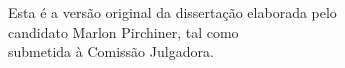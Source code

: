 \documentclass[12pt,twoside,a4paper]{book}
\numberwithin{equation}{section}
\begin{document}
    \vskip 2cm

    \begin{flushright}
	Esta é a versão original da dissertação elaborada pelo\\
	candidato Marlon Pirchiner, tal como \\
	submetida à Comissão Julgadora.
    \end{flushright}

\pagebreak


%
%
%
%
% 
% 
% 
% 
% 
%     
%       
\end{document}
